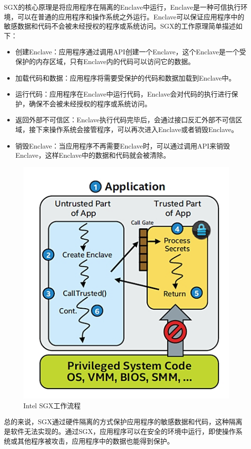 \documentclass{source/Paper}
\begin{document}
    SGX的核心原理是将应用程序在隔离的Enclave中运行，Enclave是一种可信执行环境，可以在普通的应用程序和操作系统之外运行。Enclave可以保证应用程序中的敏感数据和代码不会被未经授权的程序或系统访问。SGX的工作原理简单描述如下：
    \begin{itemize}
        \item 创建Enclave：应用程序通过调用API创建一个Enclave，这个Enclave是一个受保护的内存区域，只有Enclave内的代码可以访问它的数据。
        \item 加载代码和数据：应用程序将需要受保护的代码和数据加载到Enclave中。
        \item 运行代码：应用程序在Enclave中运行代码，Enclave会对代码的执行进行保护，确保不会被未经授权的程序或系统访问。
        \item 返回外部不可信区：Enclave执行代码完毕后，会通过接口反汇外部不可信区域，接下来操作系统会接管程序，可以再次进入Enclave或者销毁Enclave。
        \item 销毁Enclave：当应用程序不再需要Enclave时，可以通过调用API来销毁Enclave，这样Enclave中的数据和代码就会被清除。
    \end{itemize}

    \begin{figure}[H]
        \centering
        \includegraphics[width=0.4\linewidth]{pic/intelsgx.jpg}
        \caption{Intel SGX工作流程}
        \label{intelsgx}
    \end{figure}
    
    总的来说，SGX通过硬件隔离的方式保护应用程序的敏感数据和代码，这种隔离是软件无法实现的。通过SGX，应用程序可以在安全的环境中运行，即使操作系统或其他程序被攻击，应用程序中的数据也能得到保护。
\end{document}
